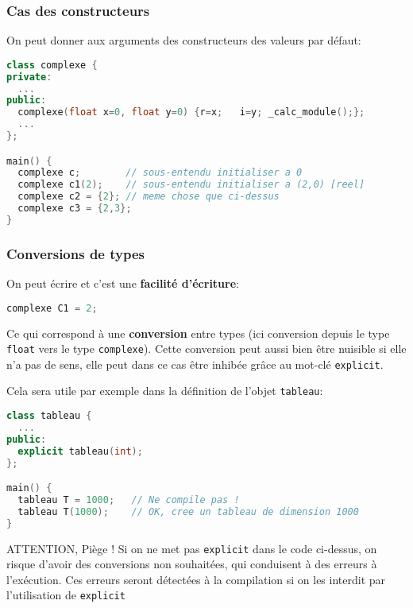 \documentclass{beamer}
\begin{document}
\begin{frame}[fragile=singleslide,shrink=20]
\frametitle {Cas des constructeurs}
On peut donner aux arguments des constructeurs des valeurs par défaut:
\begin{lstlisting}[language=c++]
class complexe {
private:
  ...
public:
  complexe(float x=0, float y=0) {r=x;   i=y; _calc_module();};
  ...
};

main() {
  complexe c;        // sous-entendu initialiser a 0
  complexe c1(2);    // sous-entendu initialiser a (2,0) [reel]
  complexe c2 = {2}; // meme chose que ci-dessus
  complexe c3 = {2,3};
}
\end{lstlisting}
\end{frame}

\begin{frame}[fragile=singleslide,shrink=20]
\frametitle {Conversions de types}

On peut écrire et c'est une \textbf{facilité d'écriture}:
\begin{lstlisting}[language=c++]
   complexe C1 = 2;
\end{lstlisting}

Ce qui correspond à une \textbf{conversion} entre types (ici conversion depuis le type \texttt{float} vers le type \texttt{complexe}). 
Cette conversion peut aussi bien être nuisible si elle n'a pas de sens, 
elle peut dans ce cas être inhibée grâce au mot-clé \texttt{explicit}. 

Cela sera utile par exemple dans la définition de l'objet \texttt{tableau}:

\begin{lstlisting}[language=c++]
class tableau {
  ...
public:
  explicit tableau(int);                                              
};

main() {
  tableau T = 1000;   // Ne compile pas !
  tableau T(1000);    // OK, cree un tableau de dimension 1000
}
\end{lstlisting}

\begin{block}{ATTENTION, Piège !}
Si on ne met pas \texttt{explicit} dans le code ci-dessus, on risque d'avoir des conversions non souhaitées, qui conduisent à des erreurs à l'exécution. 
Ces erreurs seront détectées à la compilation si on les interdit par l'utilisation de \texttt{explicit}
\end{block}
\end{frame}
\end{document}
